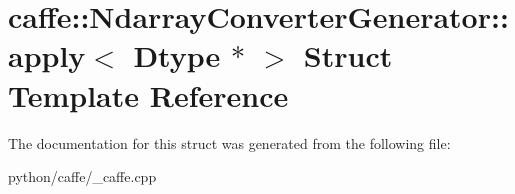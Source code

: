 \hypertarget{structcaffe_1_1_ndarray_converter_generator_1_1apply_3_01_dtype_01_5_01_4}{}\section{caffe\+:\+:Ndarray\+Converter\+Generator\+:\+:apply$<$ Dtype $\ast$ $>$ Struct Template Reference}
\label{structcaffe_1_1_ndarray_converter_generator_1_1apply_3_01_dtype_01_5_01_4}


The documentation for this struct was generated from the following file\+:\begin{DoxyCompactItemize}
\item 
python/caffe/\+\_\+caffe.\+cpp\end{DoxyCompactItemize}
